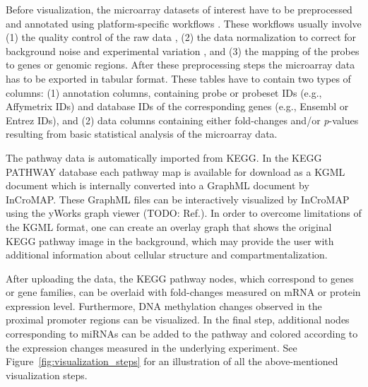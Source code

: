 \documentclass{bioinfo}
\begin{document}
Before visualization, the microarray datasets of interest have to be preprocessed and annotated
using platform-specific workflows \citep{Limma, AgiMicroRna}. These
workflows usually involve (1) the quality control of the raw data \citep{arrayQualityMetrics}, (2) the data normalization to correct for background noise and experimental
variation \citep{Lim2007}, and (3) the mapping
of the probes to genes or genomic regions. After these preprocessing steps the microarray data has
to be exported in tabular format. These tables have to contain two types of
columns: (1) annotation columns, containing probe or probeset IDs (e.g., Affymetrix IDs) and
database IDs of the corresponding genes (e.g., Ensembl or Entrez IDs), and (2) data columns
containing either fold-changes and/or \emph{p}-values resulting from basic statistical analysis of the
microarray data.


The pathway data is automatically imported from KEGG. In the KEGG PATHWAY database each pathway map
is available for download as a KGML document which is internally converted into a GraphML document
by InCroMAP. These GraphML files can be interactively visualized by InCroMAP using the yWorks graph
viewer (TODO: Ref.). In order to overcome limitations of the KGML format, one can create an overlay
graph that shows the original KEGG pathway image in the background, which may provide the user with
additional information about cellular structure and compartmentalization.

After uploading the data, the KEGG pathway nodes, which correspond to genes or gene families, can be
overlaid with fold-changes measured on mRNA or protein expression level. Furthermore, DNA
methylation changes observed in the proximal promoter regions can be visualized. In the final step,
additional nodes corresponding to miRNAs can be added to the pathway and colored according to the
expression changes measured in the underlying experiment. See Figure~\ref{fig:visualization_steps}
for an illustration of all the above-mentioned visualization steps.
\end{document}
